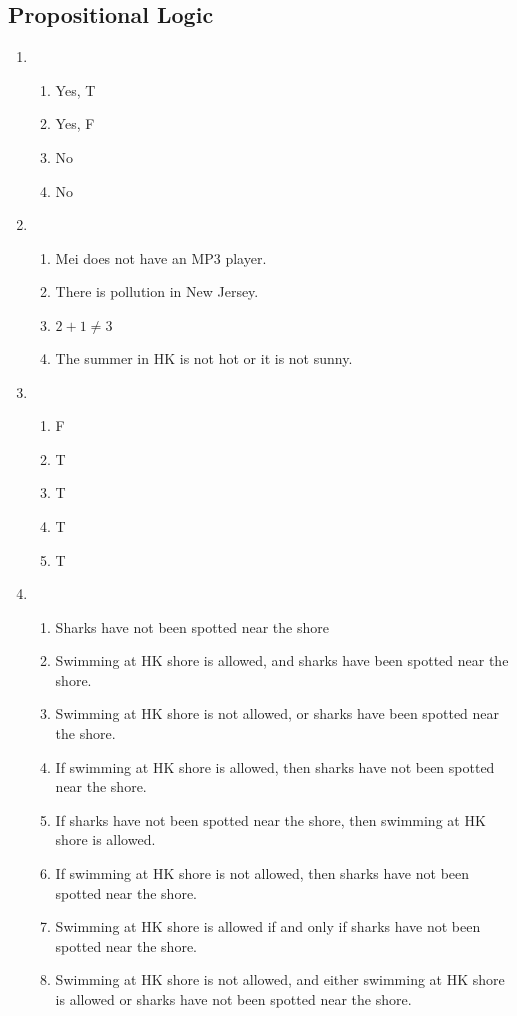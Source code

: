 \documentclass{../../cls/sig-alternate-05-2015}
\begin{document}
\subsection{Propositional Logic}
\begin{enumerate}
\item 
\begin{enumerate}
	\item Yes, T
	\item Yes, F
	\item No
	\item No
\end{enumerate}

\item 
\begin{enumerate}
	\item Mei does not have an MP3 player.
	\item There is pollution
	in New Jersey.
	\item $2 + 1 \ne 3$
	\item The summer in HK is not
	hot or it is not sunny.
\end{enumerate}

\item 
\begin{enumerate}
	\item F
	\item T
	\item T
	\item T
	\item T
\end{enumerate}

\item 
\begin{enumerate}
	\item Sharks have
	not been spotted near the shore
	\item Swimming at HK shore is allowed, and sharks have been spotted near the
	shore.
	\item Swimming at HK shore is not allowed,
	or sharks have been spotted near the shore.
	\item If swimming
	at HK shore is allowed, then sharks have not been
	spotted near the shore.
	\item If sharks have not been spotted near
	the shore, then swimming at HK shore is allowed.
	\item If swimming at HK shore is not allowed, then
	sharks have not been spotted near the shore.
	\item Swimming at HK shore is allowed if and only if sharks have
	not been spotted near the shore.
	\item Swimming at HK shore is not allowed, and either swimming at HK shore is allowed or sharks have not been spotted near
	the shore.
\end{enumerate}


\end{enumerate}
\end{document}
